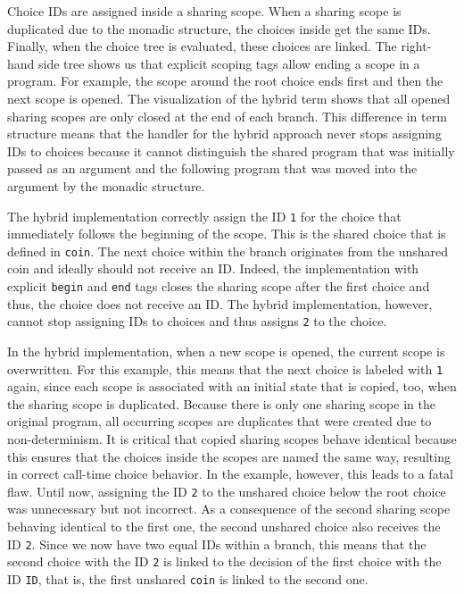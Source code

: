 \documentclass[a4paper, 11pt, fleqn, twoside]{scrreprt}
\newcommand{\hinl}[1]{\texttt{#1}}
\begin{document}
Choice IDs are assigned inside a sharing scope.
When a sharing scope is duplicated due to the monadic structure, the choices inside get the same IDs.
Finally, when the choice tree is evaluated, these choices are linked.
The right-hand side tree shows us that explicit scoping tags allow ending a scope in a program.
For example, the scope around the root choice ends first and then the next scope is opened.
The visualization of the hybrid term shows that all opened sharing scopes are only closed at the end of each branch.
This difference in term structure means that the handler for the hybrid approach never stops assigning IDs to choices because it cannot distinguish the shared program that was initially passed as an argument and the following program that was moved into the argument by the monadic structure.

The hybrid implementation correctly assign the ID \hinl{1} for the choice that immediately follows the beginning of the scope.
This is the shared choice that is defined in \hinl{coin}.
The next choice within the branch originates from the unshared coin and ideally should not receive an ID.
Indeed, the implementation with explicit \hinl{begin} and \hinl{end} tags closes the sharing scope after the first choice and thus, the choice does not receive an ID.
The hybrid implementation, however, cannot stop assigning IDs to choices and thus assigns \hinl{2} to the choice.

In the hybrid implementation, when a new scope is opened, the current scope is overwritten.
For this example, this means that the next choice is labeled with \hinl{1} again, since each scope is associated with an initial state that is copied, too, when the sharing scope is duplicated.
Because there is only one sharing scope in the original program, all occurring scopes are duplicates that were created due to non-determinism.
It is critical that copied sharing scopes behave identical because this ensures that the choices inside the scopes are named the same way, resulting in correct call-time choice behavior.
In the example, however, this leads to a fatal flaw.
Until now, assigning the ID \hinl{2} to the unshared choice below the root choice was unnecessary but not incorrect.
As a consequence of the second sharing scope behaving identical to the first one, the second unshared choice also receives the ID \hinl{2}.
Since we now have two equal IDs within a branch, this means that the second choice with the ID \hinl{2} is linked to the decision of the first choice with the ID \hinl{ID}, that is, the first unshared \hinl{coin} is linked to the second one.
\end{document}

